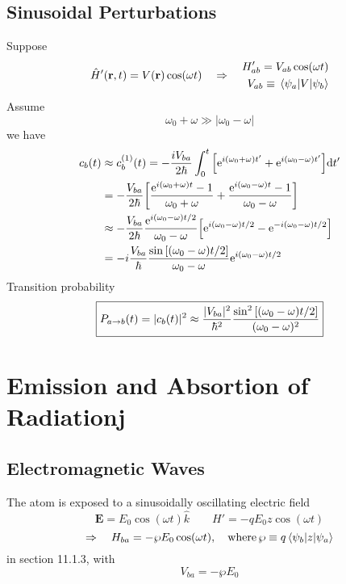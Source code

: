 \subsection{Sinusoidal Perturbations}
Suppose
\[\hat{H}'(\mathbf{r},t)=V(\mathbf{r})\cos(\omega t)\quad
\Rightarrow\quad\begin{aligned}
    H'_{ab}=V_{ab}\cos(\omega t) \\
     V_{ab}\equiv  \matrixel{\psi_a}{V}{\psi_b}
\end{aligned}\]
Assume
\[\omega_0+\omega\gg |\omega_0-\omega|\]
we have 
\[\begin{aligned}
    c_b(t) &\approx c_b^{(1)}(t)=-\frac{iV_{ba}}{2\hbar}\int_0^t\qty[{\rm e}^{i(\omega_0+\omega)t'}+{\rm e}^{i(\omega_0-\omega)t'}]\dd t' \\
           &=-\frac{V_{ba}}{2\hbar}\qty[ \frac{{\rm e}^{i(\omega_0+\omega)t}-1}{\omega_0+\omega} + \frac{{\rm e}^{i(\omega_0-\omega)t}-1}{\omega_0-\omega}] \\
           &\approx -\frac{V_{ba}}{2\hbar}\frac{{\rm e}^{i(\omega_0-\omega)t/2}}{\omega_0-\omega}\qty[{\rm e}^{i(\omega_0-\omega)t/2}-{\rm e}^{-i(\omega_0-\omega)t/2}]  \\
           &=-i\frac{V_{ba}}{\hbar}\frac{\sin\qty[(\omega_0-\omega)t/2]}{\omega_0-\omega}{\rm e}^{i(\omega_0-\omega)t/2}
\end{aligned}\]
Transition probability
\[\boxed{
    P_{a\rightarrow b}(t)=|c_b(t)|^2\approx
    \frac{|V_{ba}|^2}{\hbar^2}\frac{\sin^2\qty[(\omega_0-\omega)t/2]}{(\omega_0-\omega)^2}
}\]
\section{Emission and Absortion of Radiationj}
\subsection{Electromagnetic Waves}
The atom is exposed to a sinusoidally oscillating electric field
\[\mathbf{E}=E_0\cos(\omega t)\hat{k}\qquad H'=-qE_0z\cos(\omega t)\]
\[\Rightarrow\quad H_{ba}=-\wp E_0\cos(\omega t),\quad \text{where}\,\wp\equiv q\matrixel{\psi_b}{z}{\psi_a}\]
in section 11.1.3, with \[V_{ba}=-\wp E_0\]
